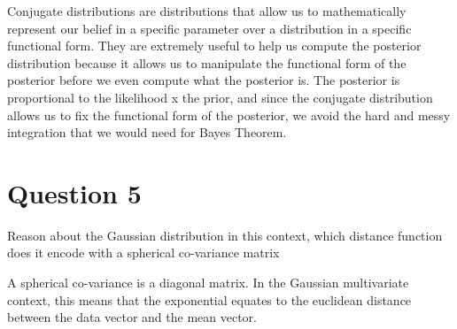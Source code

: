 \documentclass[preprint,12pt]{elsarticle}
\begin{document}
Conjugate distributions are distributions that allow us to mathematically represent our belief in a specific parameter over a distribution in a specific functional form. They are extremely useful to help us compute the posterior distribution because it allows us to manipulate the functional form of the posterior before we even compute what the posterior is. The posterior is proportional to the likelihood x the prior, and since the conjugate distribution allows us to fix the functional form of the posterior, we avoid the hard and messy integration that we would need for Bayes Theorem. 

\section{Question 5}
Reason about the Gaussian distribution in this context, which distance function does it encode with a spherical co-variance matrix

A spherical co-variance is a diagonal matrix. 
In the Gaussian multivariate context, this means that the exponential equates to the euclidean distance between the  data vector and the mean vector. 




















\end{document}
